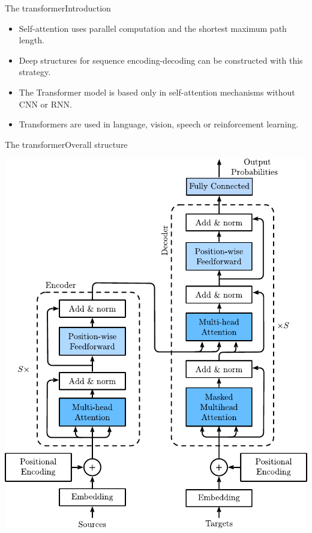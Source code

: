 \documentclass{beamer}
\begin{document}
\begin{frame}{The transformer}{Introduction}
\begin{itemize}
    \item Self-attention uses parallel computation and the shortest maximum path length.
    \item Deep structures for sequence encoding-decoding can be constructed with this strategy.
    \item The Transformer model is based only in self-attention mechanisms without CNN or RNN. 
    \item Transformers are used in language, vision, speech or reinforcement learning. 
\end{itemize}
\end{frame}

\begin{frame}{The transformer}{Overall structure}
\vspace{-0.8cm}
\begin{multicols}{2}
\includegraphics[scale=0.49]{Module 6 (Attention-based networks)/pics/transformer.pdf}
\columnbreak    



\end{multicols}
\end{frame}
\end{document}
